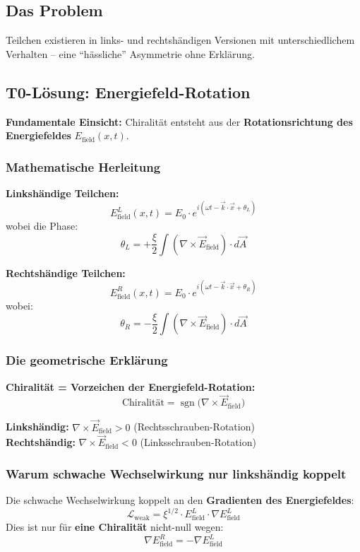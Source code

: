 	\subsection*{Das Problem}
	Teilchen existieren in links- und rechtshändigen Versionen mit unterschiedlichem Verhalten – eine ``hässliche'' Asymmetrie ohne Erklärung.
	
	\subsection*{T0-Lösung: Energiefeld-Rotation}
	
	\textbf{Fundamentale Einsicht:} Chiralität entsteht aus der \textbf{Rotationsrichtung des Energiefeldes} $E_{\text{field}}(x,t)$.
	
	\subsubsection*{Mathematische Herleitung}
	
	\textbf{Linkshändige Teilchen:}
	\[
	E_{\text{field}}^L(x,t) = E_0 \cdot e^{i(\omega t - \vec{k} \cdot \vec{x} + \theta_L)}
	\]
	wobei die Phase:
	\[
	\theta_L = +\frac{\xi}{2} \int (\nabla \times \vec{E}_{\text{field}}) \cdot d\vec{A}
	\]
	
	\textbf{Rechtshändige Teilchen:}
	\[
	E_{\text{field}}^R(x,t) = E_0 \cdot e^{i(\omega t - \vec{k} \cdot \vec{x} + \theta_R)}
	\]
	wobei:
	\[
	\theta_R = -\frac{\xi}{2} \int (\nabla \times \vec{E}_{\text{field}}) \cdot d\vec{A}
	\]
	
	\subsubsection*{Die geometrische Erklärung}
	
	\textbf{Chiralität = Vorzeichen der Energiefeld-Rotation:}
	\[
	\boxed{\text{Chiralität} = \operatorname{sgn}\bigl(\nabla \times \vec{E}_{\text{field}}\bigr)}
	\]
	
	\textbf{Linkshändig:} $\nabla \times \vec{E}_{\text{field}} > 0$ (Rechtsschrauben-Rotation) \\
	\textbf{Rechtshändig:} $\nabla \times \vec{E}_{\text{field}} < 0$ (Linksschrauben-Rotation)
	
	\subsubsection*{Warum schwache Wechselwirkung nur linkshändig koppelt}
	
	Die schwache Wechselwirkung koppelt an den \textbf{Gradienten des Energiefeldes}:
	\[
	\mathcal{L}_{\text{weak}} = \xi^{1/2} \cdot E_{\text{field}}^L \cdot \nabla E_{\text{field}}^L
	\]
	Dies ist nur für \textbf{eine Chiralität} nicht-null wegen:
	\[
	\nabla E_{\text{field}}^R = -\nabla E_{\text{field}}^L
	\]
	
